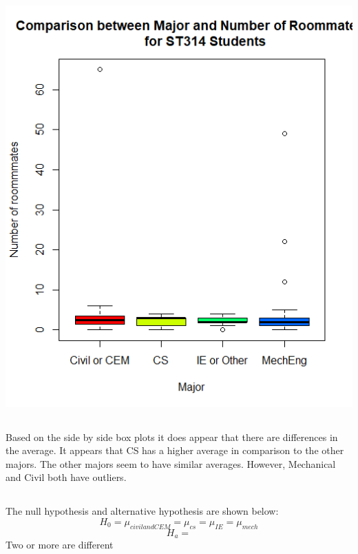 \documentclass[letterpaper, onecolumn,10pt]{IEEEtran}
\begin{document}
            \subsection{}
             \includegraphics[]{week6/images/Rplot.png}
             
             \subsection{}
             Based on the side by side box plots it does appear that there are differences in the average. It appears that CS has a higher average in comparison to the other majors. The other majors seem to have similar averages. However, Mechanical and Civil both have outliers.\\
		
		    \subsection{}
		    The null hypothesis and alternative hypothesis are shown below:
            \[
                H_0 = \mu_{civilandCEM} = \mu_{cs} = \mu_{IE} = \mu_{mech}
            \]
            \[
                H_a =
            \]
            Two or more are different
            
\end{document}
